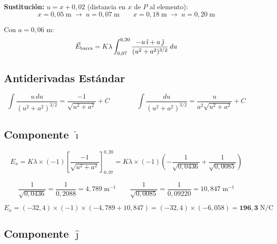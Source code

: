 \documentclass[12pt,letterpaper]{article}
\begin{document}
\textbf{Sustituci\'on:} $u = x + 0{,}02$ (distancia en $x$ de $P$ al elemento):
\begin{equation*}
    x = 0{,}05\;\text{m}\;\to\; u = 0{,}07\;\text{m}
    \qquad
    x = 0{,}18\;\text{m}\;\to\; u = 0{,}20\;\text{m}
\end{equation*}

Con $a = 0{,}06$ m:
\begin{equation*}
    \vec{E}_{\rm barra} = K\lambda\int_{0{,}07}^{0{,}20}
    \frac{-u\,\hat{\imath}+a\,\hat{\jmath}}{(u^2+a^2)^{3/2}}\,du
\end{equation*}

\subsection*{Antiderivadas Est\'andar}

\begin{equation*}
    \int\frac{u\,du}{(u^2+a^2)^{3/2}} = \frac{-1}{\sqrt{u^2+a^2}}+C
    \qquad\qquad
    \int\frac{du}{(u^2+a^2)^{3/2}} = \frac{u}{a^2\sqrt{u^2+a^2}}+C
\end{equation*}

\subsection*{Componente $\hat{\imath}$}

\begin{equation*}
    E_x = K\lambda\times(-1)\left[\frac{-1}{\sqrt{u^2+a^2}}\right]_{0{,}07}^{0{,}20}
    = K\lambda\times(-1)\left(-\frac{1}{\sqrt{0{,}0436}}+\frac{1}{\sqrt{0{,}0085}}\right)
\end{equation*}

\begin{equation*}
    \frac{1}{\sqrt{0{,}0436}} = \frac{1}{0{,}2088} = 4{,}789\;\text{m}^{-1}
    \qquad
    \frac{1}{\sqrt{0{,}0085}} = \frac{1}{0{,}09220} = 10{,}847\;\text{m}^{-1}
\end{equation*}

\begin{equation*}
    E_x = (-32{,}4)\times(-1)\times(-4{,}789+10{,}847)
    = (-32{,}4)\times(-6{,}058) = \mathbf{196{,}3}\;\text{N/C}
\end{equation*}

\subsection*{Componente $\hat{\jmath}$}
\end{document}
